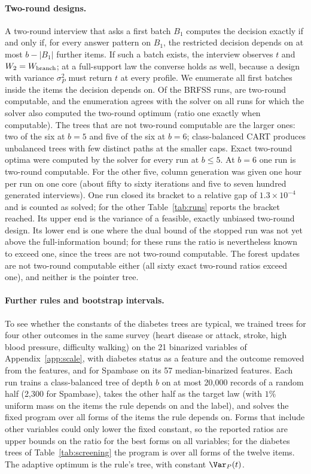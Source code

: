 \paragraph{Two-round designs.}
A two-round interview that asks a first batch $B_1$ computes the decision exactly if and only if, for every answer pattern on $B_1$, the restricted decision depends on at most $b-|B_1|$ further items. If such a batch exists, the interview observes $t$ and $W_2=W_{\rm branch}$; at a full-support law the converse holds as well, because a design with variance $\sigma_P^2$ must return $t$ at every profile. We enumerate all first batches inside the items the decision depends on. Of the \nBrfssRuns{} BRFSS runs, \nCompBrfss{} are two-round computable, and the enumeration agrees with the solver on all \nCompAgree{} runs for which the solver also computed the two-round optimum (ratio one exactly when computable). The trees that are not two-round computable are the larger ones: two of the six at $b=5$ and five of the six at $b=6$; class-balanced CART produces unbalanced trees with few distinct paths at the smaller caps. Exact two-round optima were computed by the solver for every run at $b\le5$. At $b=6$ one run is two-round computable. For the other five, column generation was given one hour per run on one core (about fifty to sixty iterations and five to seven hundred generated interviews). One run closed its bracket to a relative gap of $1.3\times10^{-4}$ and is counted as solved; for the other \nTwoBounded{} Table~\ref{tab:runs} reports the bracket reached. Its upper end is the variance of a feasible, exactly unbiased two-round design. Its lower end is one where the dual bound of the stopped run was not yet above the full-information bound; for these runs the ratio is nevertheless known to exceed one, since the trees are not two-round computable. The forest updates are not two-round computable either (all sixty exact two-round ratios exceed one), and neither is the pointer tree.

\paragraph{Further rules and bootstrap intervals.}\label{app:rules}
To see whether the constants of the diabetes trees are typical, we trained trees for four other outcomes in the same survey (heart disease or attack, stroke, high blood pressure, difficulty walking) on the 21 binarized variables of Appendix~\ref{app:scale}, with diabetes status as a feature and the outcome removed from the features, and for Spambase on its 57 median-binarized features. Each run trains a class-balanced tree of depth $b$ on at most 20,000 records of a random half (2,300 for Spambase), takes the other half as the target law (with $1\%$ uniform mass on the items the rule depends on and the label), and solves the fixed program over all forms of the items the rule depends on. Forms that include other variables could only lower the fixed constant, so the reported ratios are upper bounds on the ratio for the best forms on all variables; for the diabetes trees of Table~\ref{tab:screening} the program is over all forms of the twelve items. The adaptive optimum is the rule's tree, with constant $\Var_P(t)$.

\nRulesAppendixText


